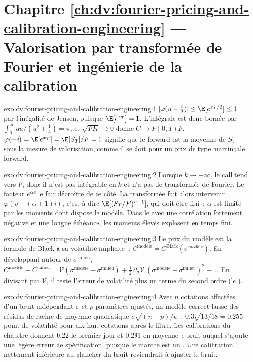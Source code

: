 \section*{Chapitre \ref{ch:dv:fourier-pricing-and-calibration-engineering} --- Valorisation par transformée de Fourier et ingénierie de la calibration}

\begin{solution}{exo:dv:fourier-pricing-and-calibration-engineering:1}
$|\varphi(u-\frac i2)|\le\E[e^{x_T/2}]\le1$ par l'inégalité de Jensen, puisque $\E[e^{x_T}]=1$. L'intégrale est donc bornée par
$\int_0^\infty du/(u^2+\frac14)=\pi$, et $\sqrt{FK}\to0$ donne $C\to P(0,T)F$. $\varphi(-i)=\E[e^{x_T}]=\E[S_T]/F=1$ signifie que le forward est la
moyenne de $S_T$ sous la mesure de valorisation, comme il se doit pour un prix de type martingale forward.
\end{solution}

\begin{solution}{exo:dv:fourier-pricing-and-calibration-engineering:2}
Lorsque $k\to-\infty$, le call tend vers $F$, donc il n'est pas intégrable en $k$ et n'a pas de transformée de Fourier. Le facteur $e^{\alpha k}$ le fait décroître
de ce côté. La transformée fait alors intervenir $\varphi(v-(\alpha+1)i)$, c'est-à-dire $\E[(S_T/F)^{\alpha+1}]$, qui doit être fini~: $\alpha$ est limité par
les moments dont dispose le modèle. Dans le  avec une corrélation fortement négative et une longue échéance, les moments élevés explosent en temps fini.
\end{solution}

\begin{solution}{exo:dv:fourier-pricing-and-calibration-engineering:3}
Le prix du modèle est la formule de Black à sa volatilité implicite~: $C^{\text{modèle}}=C^{\text{Black}}(\sigma^{\text{modèle}})$. En développant autour de
$\sigma^{\text{milieu}}$, $C^{\text{modèle}}-C^{\text{milieu}}=\mathcal V(\sigma^{\text{modèle}}-\sigma^{\text{milieu}})+\frac12\,\partial_\sigma\mathcal
V\,(\sigma^{\text{modèle}}-\sigma^{\text{milieu}})^2+\dots$ En divisant par $\mathcal V$, il reste l'erreur de volatilité plus un terme du second ordre (le ).
\end{solution}

\begin{solution}{exo:dv:fourier-pricing-and-calibration-engineering:4}
Avec $n$ cotations affectées d'un bruit indépendant $\sigma$ et $p$ paramètres ajustés, un modèle correct laisse des résidus de racine de moyenne quadratique
$\sigma\sqrt{(n-p)/n}$~: $0.3\sqrt{13/18}=0.255$ point de volatilité pour dix-huit cotations après le filtre. Les calibrations du chapitre donnent 0.22 le premier
jour et 0.291 en moyenne~: bruit auquel s'ajoute une légère erreur de spécification, puisque le marché est un . Une calibration nettement inférieure au plancher du bruit reviendrait à
ajuster le bruit.
\end{solution}

